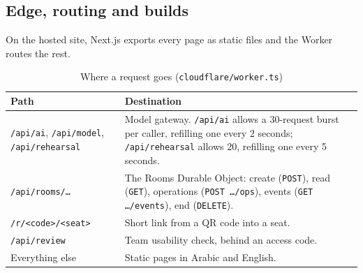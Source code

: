 \documentclass[10.5pt,a4paper]{article}
\newcommand{\thead}[1]{\textbf{#1}}
\newcommand{\toprl}{\arrayrulecolor{ink}\toprule\arrayrulecolor{rule}}
\newcommand{\code}[1]{\texttt{\small #1}}
\newcommand{\file}[1]{\leavevmode\textcolor{muted}{\texttt{\small #1}}}
\begin{document}
\subsection{Edge, routing and builds}

On the hosted site, Next.js exports every page as static files and the Worker routes the rest.

{\small
\begin{xltabular}{\textwidth}{@{}P{4.2cm}L@{}}
\caption{Where a request goes (\file{cloudflare/worker.ts})}\\
\toprl
\thead{Path} & \thead{Destination}\\
\midrule
\code{/api/ai}, \code{/api/model}, \code{/api/rehearsal} & Model gateway. \code{/api/ai} allows a 30-request burst per caller, refilling one every 2 seconds; \code{/api/rehearsal} allows 20, refilling one every 5 seconds.\\
\midrule
\code{/api/rooms/…} & The Rooms Durable Object: create (\code{POST}), read (\code{GET}), operations (\code{POST …/ops}), events (\code{GET …/events}), end (\code{DELETE}).\\
\midrule
\code{/r/<code>/<seat>} & Short link from a QR code into a seat.\\
\midrule
\code{/api/review} & Team usability check, behind an access code.\\
\midrule
Everything else & Static pages in Arabic and English.\\
\bottomrule
\end{xltabular}}
\end{document}
